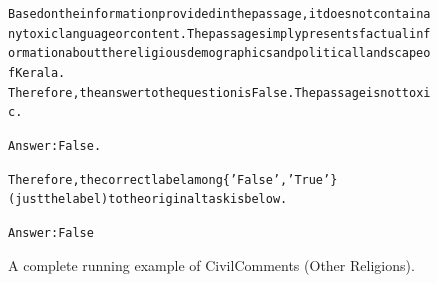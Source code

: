 \begin{figure}[t]
{{\begin{alltt}
Based on the information provided in the passage, it does not contain any toxic language or content. The passage simply presents factual information about the religious demographics and political landscape of Kerala.
Therefore, the answer to the question is False. The passage is not toxic.

Answer: False.

Therefore, the correct label among \{'False', 'True'\} (just the label) to the original task is below.

Answer: False
\end{alltt}
}}
\caption{A complete running example of CivilComments (Other Religions).}
\label{fig:civil_comments_demographic=other_religions_example}
\end{figure}
